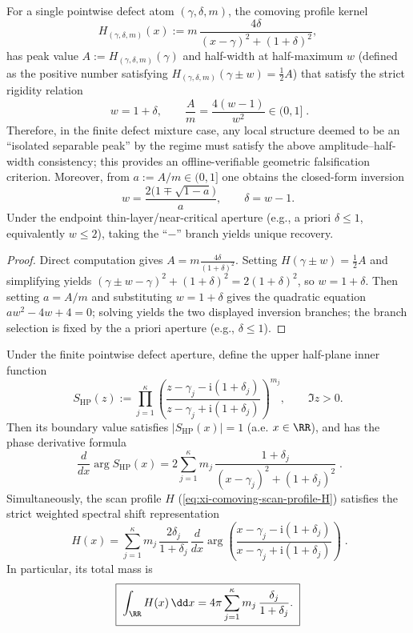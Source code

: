 \begin{proposition}\label{prop:xi-lorentzian-rigidity-amplitude-halfwidth}
For a single pointwise defect atom \((\gamma,\delta,m)\), the comoving profile kernel
\[
H_{(\gamma,\delta,m)}(x)
:=m\,\frac{4\delta}{(x-\gamma)^2+(1+\delta)^2},
\]
has peak value \(A:=H_{(\gamma,\delta,m)}(\gamma)\) and half-width at half-maximum \(w\) (defined as the positive number satisfying \(H_{(\gamma,\delta,m)}(\gamma\pm w)=\tfrac12A\)) that satisfy the strict rigidity relation
\[
\boxed{\;
w=1+\delta,\qquad
\frac{A}{m}=\frac{4(w-1)}{w^2}\in(0,1]\; }.
\]
Therefore, in the finite defect mixture case, any local structure deemed to be an ``isolated separable peak'' by the regime must satisfy the above amplitude--half-width consistency; this provides an offline-verifiable geometric falsification criterion.
Moreover, from \(a:=A/m\in(0,1]\) one obtains the closed-form inversion
\[
\boxed{\;
w=\frac{2\bigl(1\mp\sqrt{1-a}\bigr)}{a},\qquad \delta=w-1.\;}
\]
Under the endpoint thin-layer/near-critical aperture (e.g., a priori \(\delta\le 1\), equivalently \(w\le 2\)), taking the ``\(-\)'' branch yields unique recovery.
\end{proposition}

\begin{proof}
Direct computation gives
\(
A=m\frac{4\delta}{(1+\delta)^2}
\).
Setting \(H(\gamma\pm w)=\tfrac12A\) and simplifying yields
\(
(\gamma\pm w-\gamma)^2+(1+\delta)^2=2(1+\delta)^2
\), so \(w=1+\delta\).
Then setting \(a=A/m\) and substituting \(w=1+\delta\) gives the quadratic equation
\(
a w^2-4w+4=0
\); solving yields the two displayed inversion branches; the branch selection is fixed by the a priori aperture (e.g., \(\delta\le 1\)). \qedhere
\end{proof}

\begin{proposition}\label{prop:xi-scan-density-spectral-shift-phase-derivative}
Under the finite pointwise defect aperture, define the upper half-plane inner function
\[
S_{\mathrm{HP}}(z)
:=\prod_{j=1}^{\kappa}\left(\frac{z-\gamma_j-\mathrm{i}(1+\delta_j)}{z-\gamma_j+\mathrm{i}(1+\delta_j)}\right)^{m_j},
\qquad \Im z>0.
\]
Then its boundary value satisfies \(|S_{\mathrm{HP}}(x)|=1\) (a.e. \(x\in\RR\)), and has the phase derivative formula
\[
\boxed{\;
\frac{d}{dx}\arg S_{\mathrm{HP}}(x)
=2\sum_{j=1}^{\kappa}m_j\,\frac{1+\delta_j}{(x-\gamma_j)^2+(1+\delta_j)^2}\; }.
\]
Simultaneously, the scan profile \(H\) (\eqref{eq:xi-comoving-scan-profile-H}) satisfies the strict weighted spectral shift representation
\[
\boxed{\;
H(x)
=\sum_{j=1}^{\kappa}m_j\,\frac{2\delta_j}{1+\delta_j}\,
\frac{d}{dx}\arg\!\left(\frac{x-\gamma_j-\mathrm{i}(1+\delta_j)}{x-\gamma_j+\mathrm{i}(1+\delta_j)}\right)\; }.
\]
In particular, its total mass is
\[
\boxed{\;\int_{\RR}H(x)\,\dd x
=4\pi\sum_{j=1}^{\kappa}m_j\,\frac{\delta_j}{1+\delta_j}.\;}
\]
\end{proposition}

